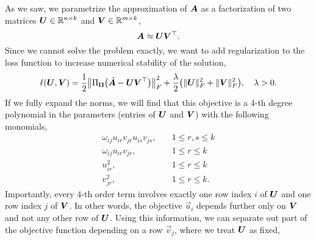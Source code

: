 As we saw, we parametrize the approximation of $\bm{A}$ as a factorization of two matrices
$\bm{U} \in \mathbb{R}^{n \times k}$ and $\bm{V} \in \mathbb{R}^{m \times k}$, \[
    \bm{A} \approx \bm{U} \bm{V}^\top.
\]
Since we cannot solve the problem exactly, we want to add regularization to the loss function to
increase numerical stability of the solution, \[
    \ell(\mat{U}, \mat{V}) = \frac{1}{2} \lft\| \Pi_{\mat{\Omega}}\lft( \tilde{\mat{A}} - \mat{U} \transpose{\mat{V}} \rgt) \rgt\|^2_F + \frac{\lambda}{2} \lft( \| \mat{U} \|_F^2 + \| \mat{V} \|_F^2 \rgt), \quad \lambda > 0.
\]
If we fully expand the norms, we will find that this objective is a 4-th degree polynomial in the
parameters (entries of $\bm{U}$ and $\bm{V}$) with the following monomials,
\begin{align*}
    \omega_{ij} u_{ir} v_{jr} u_{is} v_{js}, & \quad 1 \leq r, s \leq k \\
    \omega_{ij} u_{ir} v_{jr},               & \quad 1 \leq r \leq k    \\
    u_{ir}^2,                                & \quad 1 \leq r \leq k    \\
    v_{jr}^2,                                & \quad 1 \leq r \leq k.
\end{align*}
Importantly, every 4-th order term involves exactly one row index $i$ of $\bm{U}$ and one row index
$j$ of $\bm{V}$. In other words, the objective \wrt $\vec{u}_i$ depends further only on $\bm{V}$ and not any
other row of $\bm{U}$. Using this information, we can separate out part of the objective
function depending on a row $\vec{v}_j$, where we treat $\bm{U}$ as fixed,
